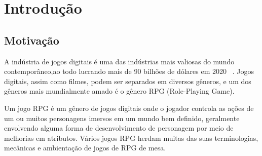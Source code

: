 \documentclass[
	12pt,				%
	openright,			%
	twoside,			%
	a4paper,			%
	english,			%
	french,				%
	spanish,			%
	brazil				%
	]{abntex2}
\begin{document}



\tableofcontents*
\cleardoublepage



\textual

\chapter{Introdução}
\section{Motivação}

A indústria de jogos digitais é uma das indústrias mais valiosas do mundo contemporâneo,ao todo lucrando mais de 90 bilhões de dólares em 2020 ~\cite{Techjury}. Jogos digitais, assim como filmes, podem ser separados em diversos gêneros, e um dos gêneros mais mundialmente amado é o gênero RPG (Role-Playing Game).

Um jogo RPG é um gênero de jogos digitais onde o jogador controla as ações de um ou muitos personagens imersos em um mundo bem definido, geralmente envolvendo alguma forma de desenvolvimento de personagem por meio de melhorias em atributos. Vários jogos RPG herdam muitas das suas terminologias, mecânicas e ambientação de jogos de RPG de mesa. ~\cite{Wiki01}
	
\end{document}
